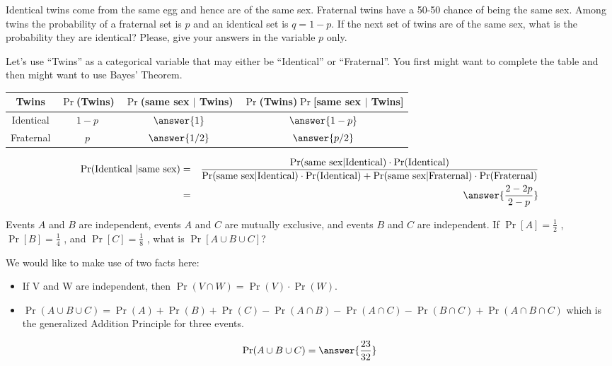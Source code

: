 \documentclass{ximera}
\begin{document}
\begin{problem}

Identical twins come from the same egg and hence are of the same sex. Fraternal twins have a 50-50 chance of being the same sex. Among twins the probability of a fraternal set is $p$ and an identical set is $q = 1 - p$. If the next set of twins are of the same sex, what is the probability they are identical? Please, give your answers in the variable $p$ only.
\begin{hint}
Let's use ``Twins'' as a categorical variable that may either be ``Identical'' or ``Fraternal''. You first might want to complete the table and then might want to use Bayes' Theorem. 
\end{hint}

\begin{prompt}
\begin{tabular}{c|c|c|c}
Twins &	$\Pr$(Twins) &	$\Pr$(same sex $|$ Twins)&	$\Pr$(Twins)$\Pr$[same sex $|$ Twins] \\
\hline
Identical &	$1-p$ &	$\answer{1}$ &	$\answer{1-p}$ \\
\hline
Fraternal &	$p$	& $\answer{1/2}$ &	$\answer{p/2}$ 
\end{tabular}

\begin{eqnarray*} 
\Pr(\text{Identical } | \text{same sex}) &=& \frac{\Pr(\text{same sex}|\text{Identical} )\cdot \Pr(\text{Identical})} {\Pr(\text{same sex}|\text{Identical})\cdot \Pr(\text{Identical})+\Pr(\text{same sex}|\text{Fraternal})\cdot\Pr(\text{Fraternal})} \\ 
&=&%
\answer{\frac{2-2p}{2-p}}\\ 
\end{eqnarray*}
\end{prompt}
\end{problem}


\begin{problem}
Events $A$ and $B$ are independent, events $A$ and $C$ are mutually exclusive, and events $B$ and $C$ are independent. If $\Pr[A]= \frac{1}{2}$ , $\Pr[B]= \frac{1}{4}$ , and $\Pr[C]= \frac{1}{8}$ , what is $\Pr[A \cup B \cup C]$? 
\begin{hint}
We would like to make use of two facts here:
\begin{itemize}
    \item If V and W are independent, then $\Pr(V\cap W)=\Pr(V)\cdot \Pr(W) $.
    \item $\Pr(A\cup B\cup C)=\Pr(A)+\Pr(B)+\Pr(C)-\Pr(A\cap B)-\Pr(A\cap C)-\Pr(B\cap C) +\Pr(A\cap B \cap C)$ which is the generalized Addition Principle for three events.
\end{itemize}
\end{hint}

\begin{prompt}
\begin{equation*}
\Pr(A\cup B \cup C ) = \answer{\frac{23}{32}} 
\end{equation*}

\end{prompt}
\end{problem}
\end{document}
